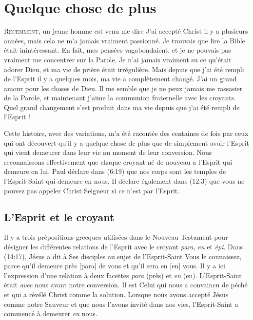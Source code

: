 \chapter{Quelque chose de plus}

\lettrine{R}{écemment}, un jeune homme est venu me dire\frcolon{}
 \Og J'ai accepté Christ il y a plusieurs années,
 mais cela ne m'a jamais vraiment passionné.
 Je trouvais que lire la Bible était inintéressant.
 En fait, mes pensées vagabondaient, et je ne pouvais pas vraiment me concentrer
 sur la Parole. Je n'ai jamais vraiment su ce qu'était adorer Dieu,
 et ma vie de prière était irrégulière. Mais depuis que j'ai été rempli
 de l'Esprit il y a quelques mois, ma vie a complètement changé.
 J'ai un grand amour pour les choses de Dieu.
 Il me semble que je ne peux jamais me rassasier de la Parole, et maintenant j'aime
 la communion fraternelle avec les croyants.
 Quel grand changement s'est produit dans ma vie depuis que j'ai été rempli
 de l'Esprit ! \Fg{}

Cette histoire, avec des variations, m'a été racontée des centaines de fois
 par ceux qui ont découvert qu'il y a quelque chose de plus que de simplement
 avoir l'Esprit qui vient demeurer dans leur vie au moment de leur conversion.
 Nous reconnaissons effectivement que chaque croyant né de nouveau a l'Esprit
 qui demeure en lui. Paul déclare dans (6:19) que nos corps
 sont les temples de l'Esprit-Saint qui demeure en nous.
 Il déclare également dans (12:3) que vous ne pouvez pas
 appeler Christ Seigneur si ce n'est par l'Esprit.


\section{L'Esprit et le croyant}

Il y a trois prépositions grecques utilisées dans le Nouveau Testament
 pour désigner les différentes relations de l'Esprit avec le croyant\frcolon{}
 \emph{para}, \emph{en} et \emph{épi}.
 Dans (14:17), Jésus a dit à Ses disciples au sujet de
 l'Esprit-Saint\frcolon{} \Og Vous le connaissez, parce qu'il demeure près [para]
 de vous et qu'il sera en [en] vous. \Fg{}
 Il y a ici l'expression d'une relation à deux facettes\frcolon{}
 \emph{para} (près) et \emph{en} (en).
 L'Esprit-Saint était \emph{avec} nous avant notre conversion.
 Il est Celui qui nous a con\-vain\-cu de péché et qui a révélé Christ
 comme la solution. Lorsque nous avons accepté Jésus comme notre Sauveur
 et que nous l'avons invité dans nos vies, l'Esprit-Saint
 a commencé à demeurer \emph{en} nous.

